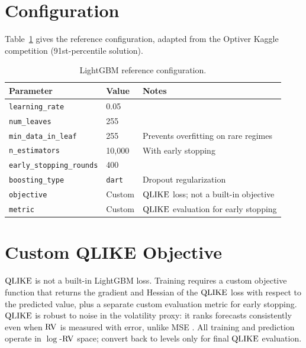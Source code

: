 \section{Configuration}
\label{sec:lgbm-config}

Table~\ref{tab:lgbm-config} gives the reference configuration, adapted from the Optiver Kaggle competition (91st-percentile solution).

\begin{table}[htbp]
\centering
\caption{LightGBM reference configuration.}
\label{tab:lgbm-config}
\small
\begin{tabular}{@{}llp{5.5cm}@{}}
\toprule
\textbf{Parameter} & \textbf{Value} & \textbf{Notes} \\
\midrule
\texttt{learning\_rate}        & 0.05    & \\
\texttt{num\_leaves}           & 255     & \\
\texttt{min\_data\_in\_leaf}   & 255     & Prevents overfitting on rare regimes \\
\texttt{n\_estimators}         & 10{,}000 & With early stopping \\
\texttt{early\_stopping\_rounds} & 400   & \\
\texttt{boosting\_type}        & \texttt{dart} & Dropout regularization \\
\texttt{objective}             & Custom  & $\operatorname{QLIKE}$ loss; not a built-in objective \\
\texttt{metric}                & Custom  & $\operatorname{QLIKE}$ evaluation for early stopping \\
\bottomrule
\end{tabular}
\end{table}


\section{Custom QLIKE Objective}
\label{sec:qlike-objective}

$\operatorname{QLIKE}$ is not a built-in LightGBM loss.
Training requires a custom objective function that returns the gradient and Hessian of the $\operatorname{QLIKE}$ loss with respect to the predicted value, plus a separate custom evaluation metric for early stopping.
$\operatorname{QLIKE}$ is robust to noise in the volatility proxy: it ranks forecasts consistently even when $\operatorname{RV}$ is measured with error, unlike MSE \citep{Patton2011}.
All training and prediction operate in $\log$-$\operatorname{RV}$ space; convert back to levels only for final $\operatorname{QLIKE}$ evaluation.


